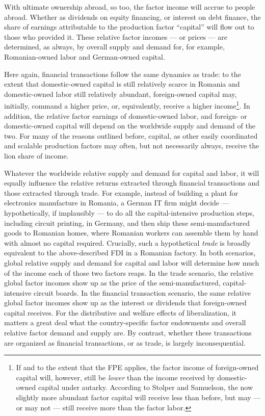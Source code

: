 \begin{enumerate}
	With ultimate ownership abroad, so too, the factor income will accrue to people abroad.
Whether as dividends on equity financing, or interest on debt finance, the share of earnings attributable to the production factor ``capital'' will flow out to those who provided it.
These relative factor incomes --- or prices --- are determined, as always, by overall supply and demand for, for example, Romanian-owned labor and German-owned capital.

	Here again, financial transactions follow the same dynamics as trade:
to the extent that domestic-owned capital is still relatively scarce in Romania and domestic-owned labor still relatively abundant, foreign-owned capital may, initially, command a higher price, or, equivalently, receive a higher income\footnote{
		If and to the extent that the \gls{FPE}  applies, the factor income of foreign-owned capital will, however, still be \emph{lower} than the income received by domestic-owned capital under autarky.
According to Stolper and Samuelson, the now slightly more abundant factor capital will receive less than before, but may --- or may not --- still receive more than the factor labor.}.
	In addition, the relative factor earnings of domestic-owned labor, and foreign- or domestic-owned capital will depend on the worldwide supply and demand of the two.
For many of the reasons outlined before, capital, as other easily coordinated and scalable production factors may often, but not necessarily always, receive the lion share of income.

	Whatever the worldwide relative supply and demand for capital and labor, it will equally influence the relative returns extracted through financial transactions and those extracted through trade.
For example, instead of building a plant for electronics manufacture in Romania, a German IT firm might decide --- hypothetically, if implausibly --- to do all the capital-intensive production steps, including circuit printing, in Germany, and then ship these semi-manufactured goods to Romanian homes, where Romanian workers can assemble them by hand with almost no capital required.
Crucially, such a hypothetical \emph{trade} is broadly equivalent to the above-described \gls{FDI} in a Romanian factory.
In both scenarios, global relative supply and demand for capital and labor will determine how much of the income each of those two factors reaps.
In the trade scenario, the relative global factor incomes show up as the price of the semi-manufactured, capital-intensive circuit boards.
In the financial transaction scenario, the same relative global factor incomes show up as the interest or dividends that foreign-owned capital receives.
For the distributive and welfare effects of liberalization, it matters a great deal what the country-specific factor endowments and overall relative factor demand and supply are.
By contrast, whether these transactions are organized as financial transactions, or as trade, is largely inconsequential.

\end{enumerate}

